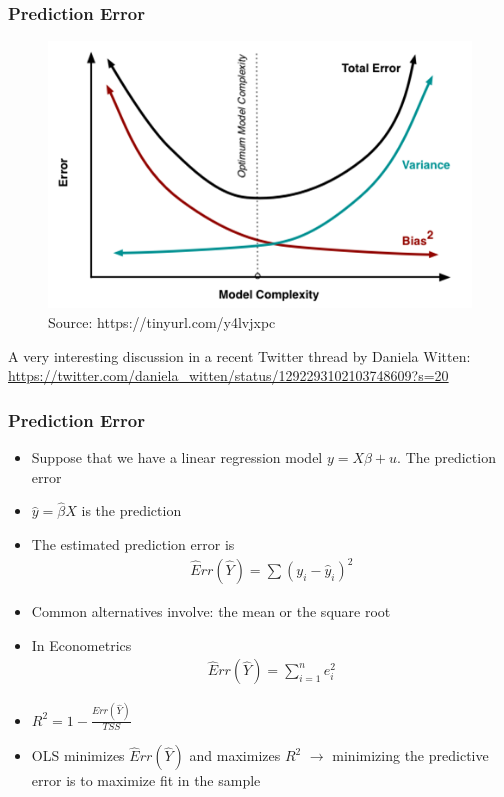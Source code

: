 \documentclass[
  shownotes,
  xcolor={svgnames},
  hyperref={colorlinks,citecolor=DarkBlue,linkcolor=DarkRed,urlcolor=DarkBlue}
  ]{beamer}
\begin{document}

\begin{frame}
\frametitle{Prediction Error}

\begin{figure}[H] \centering
  \centering
  \includegraphics[scale=0.50]{figures/medium_bias_variance_trade_off.png}
  \\
  \tiny
  Source: https://tinyurl.com/y4lvjxpc
\end{figure}


{\tiny A very interesting discussion in a recent Twitter thread by Daniela Witten: \url{https://twitter.com/daniela_witten/status/1292293102103748609?s=20}}
\end{frame}
\begin{frame}
\frametitle{Prediction Error}

\begin{itemize}
  \item Suppose that we have a linear regression model $y=X\beta +u$.  The prediction error
  \item $\hat y=\hat \beta X$ is the prediction 
  \item The estimated prediction error is 
  \begin{align}
    \hat Err (\hat Y ) = \sum (y_i-\hat y_i)^2
  \end{align}

  \item Common alternatives involve: the mean or the square root
  \item In Econometrics 
  \begin{align}
    \hat Err (\hat Y ) = \sum_{i=1}^n e_i^2
  \end{align}
  \item $R^2=1- \frac{Err (\hat Y )}{TSS}$ 
  
  \item OLS minimizes $\hat Err (\hat Y )$ and maximizes $R^2$ $\rightarrow$  minimizing the predictive error is to maximize fit in the sample

  
\end{itemize}
\end{frame}
\end{document}
